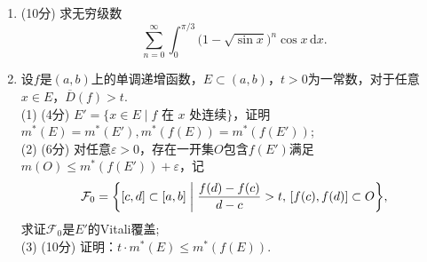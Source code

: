 \begin{enumerate}
(3) (6分) 设 $f$ 是 $\mathbb{R}$ 上的有界 Lebesgue 可测函数，且 $f$ 在 $0$ 处连续，证明：
\[\lim_{n \to \infty}\int_{\mathbb{R}}K_{n}(x)f(x)\,\text{d} m(x) = f(0).\]
(4) (8分) 进一步假设 $K(x)$ 有界且存在 $M > 0$ 使得当 $|x| > M$ 时，有 $K(x) = 0$，
设 $g$ 是 $\mathbb{R}$ 上的 Lebesgue 可积函数，叙述 $g$ 的 Lebesgue 点的定义，并证明 
\[\lim_{n \to \infty}(K_{n} * g)(x) = g(x)\]
对几乎处处的 $x$ 成立，其中
\[(K_{n} * g)(x) = \int_{\mathbb{R}}K_{n}(x - y)g(y)\,\text{d} y.\]
\item (10分) 求无穷级数$$\sum_{n=0}^{\infty}\int_0^{\pi/3}\big(1-\sqrt{\sin x}\big)^n\cos x \,\text{d}x.$$
\item 设$f$是$(a,b)$上的单调递增函数，$E\subset(a,b)$，$t>0$为一常数，对于任意$x\in E$，$\overline{D}(f)>t$.\\
(1) (4分) $E'=\{x\in E \mid f\text{ 在 }x\text{ 处连续}\}$，证明$m^*(E)=m^*(E'),m^*(f(E))=m^*(f(E'))$;\\
(2) (6分) 对任意$\varepsilon>0$，存在一开集$O$包含$f(E')$满足$m(O)\leqslant m^*(f(E'))+\varepsilon$，记
\[\mathcal{F}_0=\bigg\{[c,d]\subset[a,b]\biggm|\frac{f(d)-f(c)}{d-c}>t,\,[f(c),f(d)]\subset O\bigg\},\]
求证$\mathcal{F}_0$是$E'$的Vitali覆盖;\\
(3) (10分) 证明：$t\cdot m^*(E)\leqslant m^*(f(E))$.
\end{enumerate}

